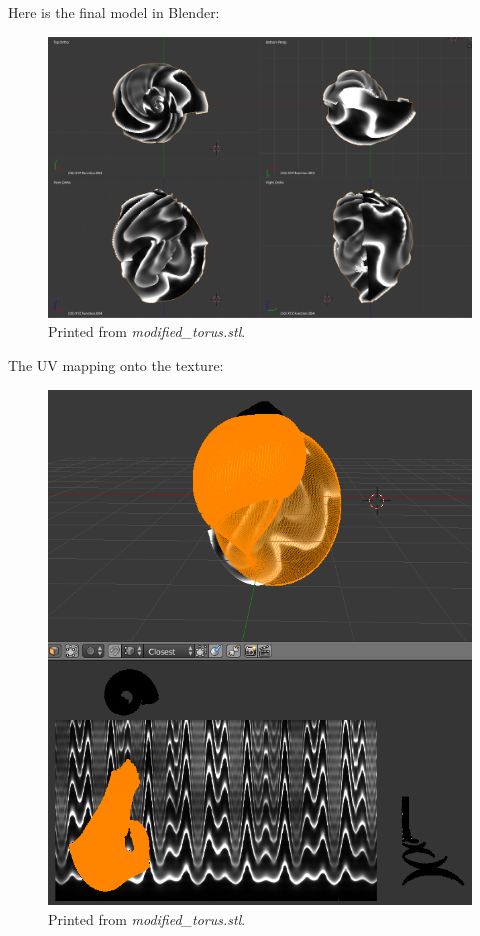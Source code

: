 \documentclass[a4paper]{article}
\begin{document}
Here is the final model in Blender:

\begin{figure}[h]
	\centering\includegraphics[scale=1.0]{./img/hexaplex_quad.png}
	\caption{Printed from \textit{modified\_torus.stl}.}
	\label{3d-printed-torus} %
\end{figure}

The UV mapping onto the texture:

\begin{figure}[h]
	\centering\includegraphics[scale=1.25]{./img/uv_map.png}
	\caption{Printed from \textit{modified\_torus.stl}.}
	\label{3d-printed-torus} %
\end{figure}
\end{document}
